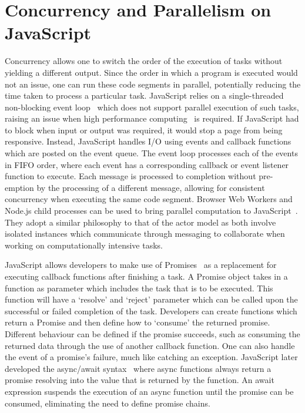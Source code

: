 \documentclass[12pt, a4paper]{report}
\theoremstyle{definition}
\theoremstyle{definition}%
\theoremstyle{definition}%
\theoremstyle{definition}%
\theoremstyle{definition}%
\theoremstyle{definition}%
\begin{document}
\section{Concurrency and Parallelism on JavaScript}
Concurrency allows one to switch the order of the execution of tasks without yielding a different output. Since the order in which a program is executed would not an issue, one can run these code segments in parallel, potentially reducing the time taken to process a particular task. JavaScript relies on a single-threaded non-blocking event loop~\cite{eventloopbrowser}\cite{eventloopnode} which does not support parallel execution of such tasks, raising an issue when high performance computing~\cite{highperformance} is required. If JavaScript had to block when input or output was required, it would stop a page from being responsive. Instead, JavaScript handles I/O using events and callback functions which are posted on the event queue. The event loop processes each of the events in FIFO order, where each event has a corresponding callback or event listener function to execute. Each message is processed to completion without pre-emption by the processing of a different message, allowing for consistent concurrency when executing the same code segment. Browser Web Workers\cite{webworkers} and Node.js child processes\cite{cluster} can be used to bring parallel computation to JavaScript~\cite{concurrencyjs}\cite{spidersjs}. They adopt a similar philosophy to that of the actor model as both involve isolated instances which communicate through messaging to collaborate when working on computationally intensive tasks.

JavaScript allows developers to make use of Promises~\cite{promises} as a replacement for executing callback functions after finishing a task. A Promise object takes in a function as parameter which includes the task that is to be executed. This function will have a `resolve' and `reject' parameter which can be called upon the successful or failed completion of the task. Developers can create functions which return a Promise and then define how to `consume' the returned promise. Different behaviour can be defined if the promise succeeds, such as consuming the returned data through the use of another callback function. One can also handle the event of a promise's failure, much like catching an exception. JavaScript later developed the async/await syntax~\cite{async} where async functions always return a promise resolving into the value that is returned by the function. An await expression suspends the execution of an async function until the promise can be consumed, eliminating the need to define promise chains.
\end{document}
